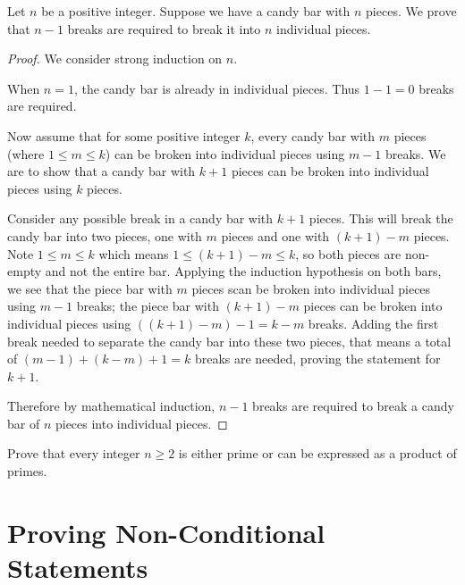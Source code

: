 \begin{example}
    Let $n$ be a positive integer. Suppose we have a candy bar with $n$ pieces. We prove that $n - 1$ breaks are required to break it into $n$ individual pieces.
    \begin{proof}
        We consider strong induction on $n$.

        When $n = 1$, the candy bar is already in individual pieces. Thus $1 - 1 = 0$ breaks are required.

        Now assume that for some positive integer $k$, every candy bar with $m$ pieces (where $1 \leq m \leq k$) can be broken into individual pieces using $m - 1$ breaks. We are to show that a candy bar with $k + 1$ pieces can be broken into individual pieces using $k$ pieces.

        Consider any possible break in a candy bar with $k+1$ pieces. This will break the candy bar into two pieces, one with $m$ pieces and one with $(k+1)-m$ pieces. Note $1 \leq m \leq k$ which means $1 \leq (k+1)-m \leq k$, so both pieces are non-empty and not the entire bar. Applying the induction hypothesis on both bars, we see that the piece bar with $m$ pieces scan be broken into individual pieces using $m-1$ breaks; the piece bar with $(k+1)-m$ pieces can be broken into individual pieces using $((k+1)-m)-1 = k-m$ breaks. Adding the first break needed to separate the candy bar into these two pieces, that means a total of $(m-1) + (k-m) + 1 = k$ breaks are needed, proving the statement for $k+1$.

        Therefore by mathematical induction, $n - 1$ breaks are required to break a candy bar of $n$ pieces into individual pieces.
    \end{proof}
\end{example}

\begin{exercise}
    Prove that every integer $n \geq 2$ is either prime or can be expressed as a product of primes.
\end{exercise}

\section{Proving Non-Conditional Statements}
